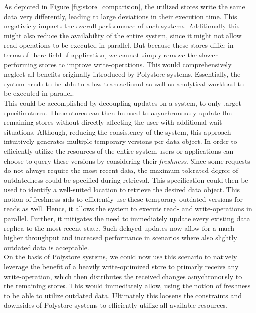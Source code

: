 As depicted in Figure \ref{fig:store_comparision}, the utilized stores write the same data very differently, leading to large deviations in their execution time. 
This negativiely impacts the overall performance of such systems.
Additionally this might also reduce the availability of the entire system, since it might not allow read-operations to be executed in parallel. 
But because these stores differ in terms of there field of application, we cannot simply remove the slower performing stores to improve write-operations. 
This would comprehensively neglect all benefits originally introduced by Polystore systems.
Essentially, the system needs to be able to allow transactional as well as analytical workload to be executed in parallel.\\
This could be accomplished by decoupling updates on a system, to only target specific stores. 
These stores can then be used to asynchronously update
the remaining stores without directly affecting the user with additional wait-situations.
Although, reducing the consistency of the system, this approach intuitively generates multiple temporary versions per data object.
In order to efficiently utilize the resources of the entire system users or applications can choose to query these versions by
considering their \emph{freshness}.
Since some requests do not always require the most recent data, the maximum tolerated degree of outdatedness could be specified during retrieval.
This specification could then be used to identify a well-suited location to retrieve the desired data object. 
This notion of freshness aids to efficiently use these temporary outdated versions for reads as well. 
Hence, it allows the system to execute read- and write-operations in parallel.
Further, it mitigates the need to immediately update every existing data replica to the most recent state.
Such delayed updates now allow for a much higher throughput and increased performance in scenarios where also slightly 
outdated data is acceptable.\\
On the basis of Polystore systems, we could now use this scenario to natively leverage the benefit of a heavily write-optimized store to 
primarly receive any write-operation, which then distributes the received changes asnychronously to the remaining stores. This
would immediately allow, using the notion of freshness to be able to utilize outdated data.
Ultimately this loosens the constraints and downsides of Polystore systems to efficiently utilize all available resources.



